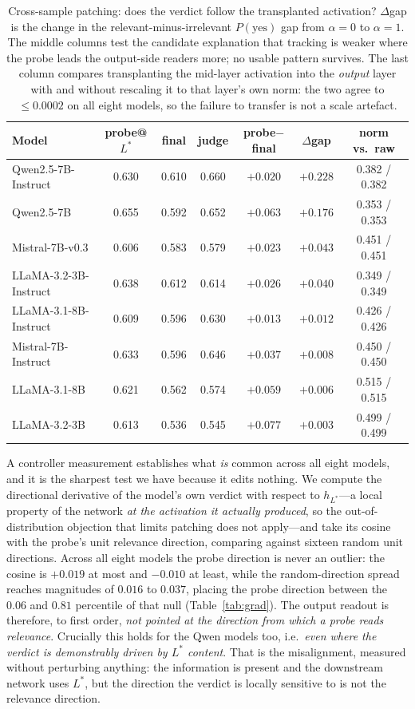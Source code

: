 \documentclass[11pt]{article}
\begin{document}
\begin{table}[t]
\centering\small
\caption{Cross-sample patching: does the verdict follow the transplanted
activation? $\Delta$gap is the change in the relevant-minus-irrelevant
$P(\text{yes})$ gap from $\alpha{=}0$ to $\alpha{=}1$. The middle columns test
the candidate explanation that tracking is weaker where the probe leads the
output-side readers more; no usable pattern survives. The last column compares
transplanting the mid-layer activation into the \emph{output} layer with and
without rescaling it to that layer's own norm: the two agree to $\le0.0002$ on
all eight models, so the failure to transfer is not a scale artefact.}
\label{tab:tracking}
\begin{tabular}{lcccccc}
\toprule
Model & probe@$L^*$ & final & judge & probe$-$final & $\Delta$gap & norm vs.\ raw \\
\midrule
Qwen2.5-7B-Instruct   & 0.630 & 0.610 & 0.660 & $+0.020$ & $\mathbf{+0.228}$ & 0.382 / 0.382 \\
Qwen2.5-7B            & 0.655 & 0.592 & 0.652 & $+0.063$ & $+0.176$ & 0.353 / 0.353 \\
Mistral-7B-v0.3       & 0.606 & 0.583 & 0.579 & $+0.023$ & $+0.043$ & 0.451 / 0.451 \\
LLaMA-3.2-3B-Instruct & 0.638 & 0.612 & 0.614 & $+0.026$ & $+0.040$ & 0.349 / 0.349 \\
LLaMA-3.1-8B-Instruct & 0.609 & 0.596 & 0.630 & $+0.013$ & $+0.012$ & 0.426 / 0.426 \\
Mistral-7B-Instruct   & 0.633 & 0.596 & 0.646 & $+0.037$ & $+0.008$ & 0.450 / 0.450 \\
LLaMA-3.1-8B          & 0.621 & 0.562 & 0.574 & $+0.059$ & $+0.006$ & 0.515 / 0.515 \\
LLaMA-3.2-3B          & 0.613 & 0.536 & 0.545 & $+0.077$ & $+0.003$ & 0.499 / 0.499 \\
\bottomrule
\end{tabular}
\end{table}

A controller measurement establishes what \emph{is} common across all eight
models, and it is the sharpest test we have because it edits nothing. We compute
the directional derivative of the model's own verdict with respect to
$h_{L^*}$---a local property of the network \emph{at the activation it actually
produced}, so the out-of-distribution objection that limits patching does not
apply---and take its cosine with the probe's unit relevance direction, comparing
against sixteen random unit directions. Across all eight models the probe
direction is never an outlier: the cosine is $+0.019$ at most and $-0.010$ at
least, while the random-direction spread reaches magnitudes of $0.016$ to
$0.037$, placing the probe direction between the $0.06$ and $0.81$ percentile of
that null (Table~\ref{tab:grad}). The output readout is therefore, to first
order, \emph{not pointed at the direction from which a probe reads relevance}.
Crucially this holds for the Qwen models too, i.e.\ \emph{even where the verdict
is demonstrably driven by $L^*$ content}. That is the misalignment, measured
without perturbing anything: the information is present and the downstream
network uses $L^*$, but the direction the verdict is locally sensitive to is not
the relevance direction.
\end{document}
